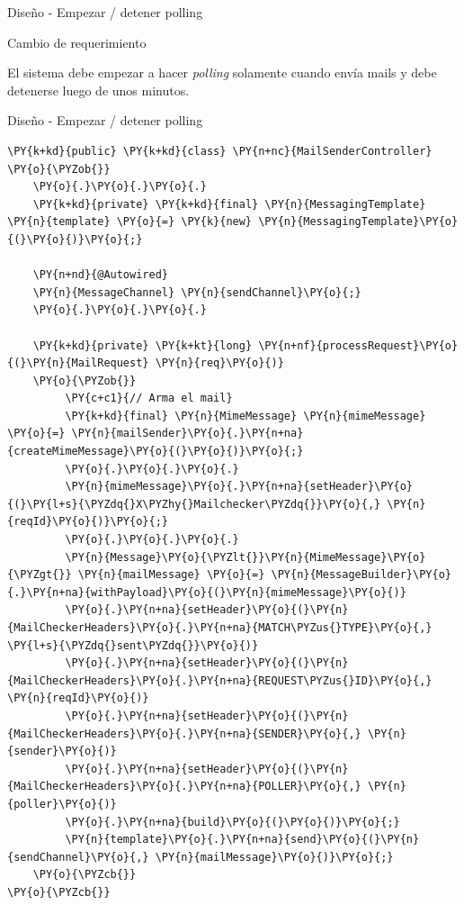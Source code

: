 \documentclass{beamer}
\begin{document}
\begin{frame}{Diseño - Empezar / detener polling}
\begin{center}
\Large{Cambio de requerimiento}
\end{center}
El sistema debe empezar a hacer \textit{polling} solamente cuando envía mails y debe detenerse luego de unos minutos.
\end{frame}

\begin{frame}[fragile]{Diseño - Empezar / detener polling}
\begin{Verbatim}[fontsize=\tiny,commandchars=\\\{\}]
\PY{k+kd}{public} \PY{k+kd}{class} \PY{n+nc}{MailSenderController}
\PY{o}{\PYZob{}}
    \PY{o}{.}\PY{o}{.}\PY{o}{.}
    \PY{k+kd}{private} \PY{k+kd}{final} \PY{n}{MessagingTemplate} \PY{n}{template} \PY{o}{=} \PY{k}{new} \PY{n}{MessagingTemplate}\PY{o}{(}\PY{o}{)}\PY{o}{;}

    \PY{n+nd}{@Autowired}
    \PY{n}{MessageChannel} \PY{n}{sendChannel}\PY{o}{;}
    \PY{o}{.}\PY{o}{.}\PY{o}{.}

    \PY{k+kd}{private} \PY{k+kt}{long} \PY{n+nf}{processRequest}\PY{o}{(}\PY{n}{MailRequest} \PY{n}{req}\PY{o}{)}
    \PY{o}{\PYZob{}}
         \PY{c+c1}{// Arma el mail}
         \PY{k+kd}{final} \PY{n}{MimeMessage} \PY{n}{mimeMessage} \PY{o}{=} \PY{n}{mailSender}\PY{o}{.}\PY{n+na}{createMimeMessage}\PY{o}{(}\PY{o}{)}\PY{o}{;}
         \PY{o}{.}\PY{o}{.}\PY{o}{.}
         \PY{n}{mimeMessage}\PY{o}{.}\PY{n+na}{setHeader}\PY{o}{(}\PY{l+s}{\PYZdq{}X\PYZhy{}Mailchecker\PYZdq{}}\PY{o}{,} \PY{n}{reqId}\PY{o}{)}\PY{o}{;}
         \PY{o}{.}\PY{o}{.}\PY{o}{.}
         \PY{n}{Message}\PY{o}{\PYZlt{}}\PY{n}{MimeMessage}\PY{o}{\PYZgt{}} \PY{n}{mailMessage} \PY{o}{=} \PY{n}{MessageBuilder}\PY{o}{.}\PY{n+na}{withPayload}\PY{o}{(}\PY{n}{mimeMessage}\PY{o}{)}
         \PY{o}{.}\PY{n+na}{setHeader}\PY{o}{(}\PY{n}{MailCheckerHeaders}\PY{o}{.}\PY{n+na}{MATCH\PYZus{}TYPE}\PY{o}{,} \PY{l+s}{\PYZdq{}sent\PYZdq{}}\PY{o}{)}
         \PY{o}{.}\PY{n+na}{setHeader}\PY{o}{(}\PY{n}{MailCheckerHeaders}\PY{o}{.}\PY{n+na}{REQUEST\PYZus{}ID}\PY{o}{,} \PY{n}{reqId}\PY{o}{)}
         \PY{o}{.}\PY{n+na}{setHeader}\PY{o}{(}\PY{n}{MailCheckerHeaders}\PY{o}{.}\PY{n+na}{SENDER}\PY{o}{,} \PY{n}{sender}\PY{o}{)}
         \PY{o}{.}\PY{n+na}{setHeader}\PY{o}{(}\PY{n}{MailCheckerHeaders}\PY{o}{.}\PY{n+na}{POLLER}\PY{o}{,} \PY{n}{poller}\PY{o}{)}
         \PY{o}{.}\PY{n+na}{build}\PY{o}{(}\PY{o}{)}\PY{o}{;}
         \PY{n}{template}\PY{o}{.}\PY{n+na}{send}\PY{o}{(}\PY{n}{sendChannel}\PY{o}{,} \PY{n}{mailMessage}\PY{o}{)}\PY{o}{;}
    \PY{o}{\PYZcb{}}
\PY{o}{\PYZcb{}}
\end{Verbatim}
\end{frame}
\end{document}
